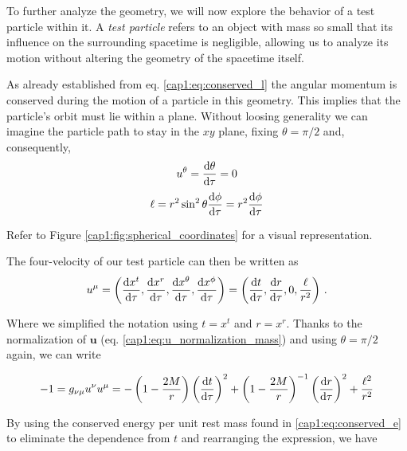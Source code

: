 \begin{minipage}{0.57 \textwidth}
    To further analyze the \Sh geometry, we will now explore the behavior of a
    test particle within it.
    A \textit{test particle} refers to an object with mass so small that its
    influence on the surrounding spacetime is negligible, allowing us to
    analyze its motion without altering the geometry of the spacetime itself.

    As already established from eq. \ref{cap1:eq:conserved_l} the angular
    momentum is conserved during the motion of a particle in this geometry.
    This implies that the particle's orbit must lie within a plane.
    Without loosing generality we can imagine the particle path to stay in the
    $xy$ plane, fixing $\theta = \pi / 2$ and, consequently,
    \begin{equation*}
        u^\theta = \dv{\theta}{\tau} = 0 
    \end{equation*}
    \begin{equation*}
        \ell = r^2 \sin^2 \theta \dv{\phi}{\tau} = r^2 \dv{\phi}{\tau}
    \end{equation*}

    Refer to Figure \ref{cap1:fig:spherical_coordinates} for a visual
    representation.
\end{minipage}
\hspace{0.02 \textwidth}

The four-velocity of our test particle can then be written as
\begin{equation*}
    u^\mu
    = \left(\dv{x^t}{\tau}, \dv{x^r}{\tau}, \dv{x^\theta}{\tau},
    \dv{x^\phi}{\tau} \right)
    = \left(\dv{t}{\tau}, \dv{r}{\tau}, 0, \frac{\ell}{r^2} \right) \, .
\end{equation*}

Where we simplified the notation using $t = x^t$ and $r = x^r$.
Thanks to the normalization of $\mathbf u$ (eq.
\ref{cap1:eq:u_normalization_mass}) and using $\theta = \pi / 2$ again, we can
write

\begin{equation*}
    - 1 = g_{\nu \mu} u^\nu u^\mu =
    - \left(1 - \frac{2M}{r} \right) \left(\dv{t}{\tau} \right)^2
    + \left(1 - \frac{2M}{r} \right)^{- 1} \left(\dv{r}{\tau} \right)^2
    + \frac{\ell^2}{r^2}
\end{equation*}

By using the conserved energy per unit rest mass found in
\ref{cap1:eq:conserved_e} to eliminate the dependence from $t$ and rearranging
the expression, we have

